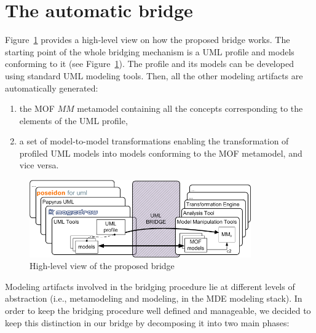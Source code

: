 \section{The automatic bridge}\label{sec:framework}
%

Figure~\ref{fig:overall} provides a high-level view on how the proposed bridge works. The starting point of the whole bridging mechanism is a UML profile and models conforming to it (see Figure~\ref{fig:overall}). The profile and its models can be developed using standard UML modeling tools. Then, all the other modeling artifacts are automatically generated:
\vspace{-.1cm}
\begin{enumerate}
	\item the MOF $MM$ metamodel containing all the concepts corresponding to the elements of the UML profile,
	\item a set of model-to-model transformations enabling the transformation of profiled UML models into models
conforming to the MOF metamodel, and vice versa.
\end{enumerate}
%
\vspace{-.6cm}
\begin{figure}[htbp]
	\centering
		\includegraphics[width=0.85\textwidth]{figures/overview.png}
	\caption{High-level view of the proposed bridge}
	\label{fig:overall}
\end{figure}
\vspace{-.6cm}
Modeling artifacts involved in the bridging procedure lie at different levels of abstraction
(i.e., metamodeling and modeling, in the MDE modeling stack). In order to keep the bridging procedure well defined and manageable,
we decided to keep this distinction in our bridge by decomposing it into two main phases:
%
\vspace{-.1cm}
